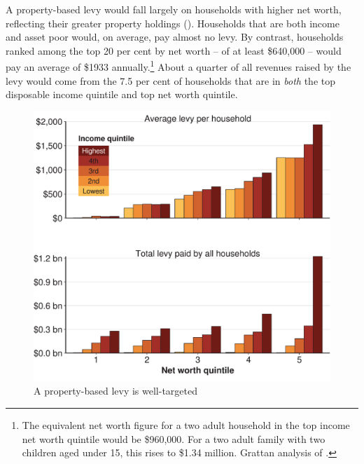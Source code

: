 A property-based levy would fall largely on households with higher net worth, reflecting their greater property holdings (). Households that are both income and asset poor would, on average, pay almost no levy. By contrast, households ranked among the top 20 per cent by net worth – of at least \$640,000 – would pay an average of \$1933 annually.\footnote{The equivalent net worth figure for a two adult household in the top income net worth quintile would be \$960,000. For a two adult family with two children aged under 15, this rises to \$1.34 million. Grattan analysis of \textcites{ABS2013t}{ABS2014e}.}  About a quarter of all revenues raised by the levy would come from the 7.5 per cent of households that are in \emph{both} the top disposable income quintile and top net worth quintile. 

\begin{figure}
\caption{A property-based levy is well-targeted\label{fig:PROP-11}}%
\includegraphics[width=\columnwidth]{Property-taxes/atlas/figure/Figure11-1.pdf}

\end{figure}

